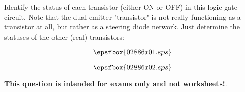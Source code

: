 

Identify the status of each transistor (either ON or OFF) in this logic gate circuit.  Note that the dual-emitter "transistor" is not really functioning as a transistor at all, but rather as a steering diode network.  Just determine the statuses of the other (real) transistors:

$$\epsfbox{02886x01.eps}$$







$$\epsfbox{02886x02.eps}$$







{\bf This question is intended for exams only and not worksheets!}.




